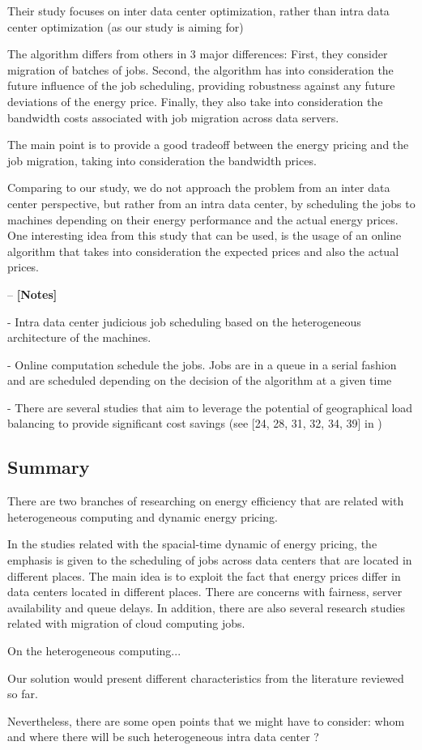 Their study focuses on inter data center optimization, rather than intra data
center optimization (as our study is aiming for)

The algorithm differs from others in 3 major differences: First, they consider
migration of batches of jobs. Second, the algorithm has into consideration the
future influence of the job scheduling, providing robustness against any future
deviations of the energy price. Finally, they also take into consideration the 
bandwidth costs associated with job migration across data servers.

The main point is to provide a good tradeoff between the energy pricing and the
job migration, taking into consideration the bandwidth prices.

Comparing to our study, we do not approach the problem from an inter data center
perspective, but rather from an intra data center, by scheduling the jobs to
machines depending on their energy performance and the actual energy prices. One
interesting idea from this study that can be used, is the usage of an online
algorithm that takes into consideration the expected prices and also the actual
prices.



--
\textbf{[Notes]}

- Intra data center judicious job scheduling based on the heterogeneous
architecture of the machines.

- Online computation schedule the jobs. Jobs are in a queue in a serial fashion
  and are scheduled depending on the decision of the algorithm at a given time

- There are several studies that aim to leverage the potential of geographical 
  load balancing to provide significant cost savings (see [24, 28, 31, 32, 34,
  39] in \cite{GREENING})


\subsection{Summary}

\begin{comment}
  Add citation in the summary  
\end{comment}

There are two branches of researching on energy efficiency that are related 
with heterogeneous computing and dynamic energy pricing.

In the studies related with the spacial-time dynamic of energy pricing, the 
emphasis is given to the scheduling of jobs across data centers that are located 
in different places. The main idea is to exploit the fact that energy prices 
differ in data centers located in different places. There are concerns with 
fairness, server availability and queue delays. In addition, there are also
several research studies related with migration of cloud computing jobs.

On the heterogeneous computing...

Our solution would present different characteristics from the literature
reviewed so far.

Nevertheless, there are some open points that we might have to consider: whom
and where there will be such heterogeneous intra data center ?
